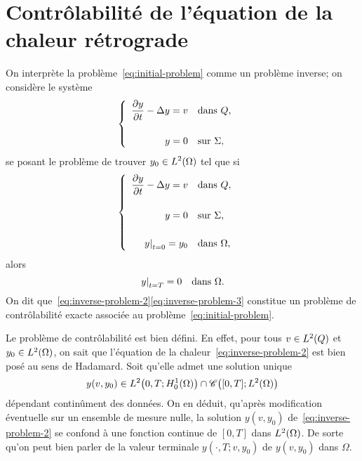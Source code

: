 \section{Contrôlabilité de l'équation de la chaleur rétrograde}

On interprète la problème~\eqref{eq:initial-problem} comme un problème
inverse; on considère le système
\begin{equation}\label{eq:inverse-problem-1}
    \begin{cases}\displaystyle
        \begin{array}{rl}
            \dfrac{\partial{}y}{\partial{}t} - \Delta y = v & \text{dans}\ Q,\\
            \\
            y = 0 & \text{sur}\ \Sigma,
        \end{array}
    \end{cases}
\end{equation}
se posant le problème de trouver $\displaystyle y_{0}\in L^{2}\!\left({\Omega}\right)$ tel
que si
\begin{equation}\label{eq:inverse-problem-2}
    \begin{cases}\displaystyle
        \begin{array}{rl}
            \dfrac{\partial{}y}{\partial{}t} - \Delta y = v & \text{dans}\ Q,\\
            \\
            y = 0 & \text{sur}\ \Sigma,\\
            \\
            {\left.{y}\right|}_{t = 0} = y_{0} & \text{dans}\ \Omega,
        \end{array}
    \end{cases}
\end{equation}
alors
\begin{equation}\label{eq:inverse-problem-3}
    {\left.{y}\right|}_{t = T} = 0\quad\text{dans}\ \Omega.
\end{equation}
On dit que~\eqref{eq:inverse-problem-2}\eqref{eq:inverse-problem-3}
constitue un problème de contrôlabilité exacte associée au
problème~\eqref{eq:initial-problem}.

\begin{remarque}%
    Le problème de contrôlabilité est bien défini. En effet, pour tous
    $v\in L^{2}\!\left({Q}\right)$ et $y_{0}\in L^{2}\!\left({\Omega}\right)$, on sait que l'équation de
    la chaleur~\eqref{eq:inverse-problem-2} est bien posé au sens de
    Hadamard. Soit qu'elle admet une solution unique
    \begin{equation}\label{eq:well-posedness-heat-equation}
        y\!\left({v,y_{0}}\right)\in L^{2}\!\left({0,T; H_{0}^{1}(\Omega)}\right)\cap
        \mathscr{C}\!\left({[0,T];L^{2}\!\left({\Omega}\right)}\right)
    \end{equation}
    dépendant continûment des données. On en déduit, qu'après modification
    éventuelle sur un ensemble de mesure nulle, la solution
    $y\!\left({v,y_{0}}\right)$ de~\eqref{eq:inverse-problem-2} se confond
    à une fonction continue de $[0,T]$ dans $L^{2}\!\left({\Omega}\right)$. De sorte
    qu'on peut bien parler de la valeur terminale
    $y\!\left({\cdot,T;v,y_{0}}\right)$ de $y\!\left({v,y_{0}}\right)$ dans
    $\Omega$.
\end{remarque}

